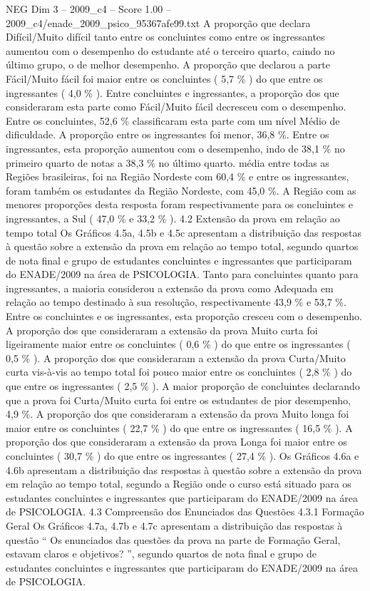 \begin{textsample}{NEG Dim 3 – 2009\_c4 – Score 1.00 – 2009\_c4/enade\_2009\_psico\_95367afe99.txt}
A proporção que declara Difícil/Muito difícil tanto entre os concluintes como entre os ingressantes aumentou com o desempenho do estudante até o terceiro quarto, caindo no último grupo, o de melhor desempenho.
A proporção que declarou a parte Fácil/Muito fácil foi maior entre os concluintes ( 5,7 \% ) do que entre os ingressantes ( 4,0 \% ).
Entre concluintes e ingressantes, a proporção dos que consideraram esta parte como Fácil/Muito fácil decresceu com o desempenho.
Entre os concluintes, 52,6 \% classificaram esta parte com um nível Médio de dificuldade.
A proporção entre os ingressantes foi menor, 36,8 \%.
Entre os ingressantes, esta proporção aumentou com o desempenho, indo de 38,1 \% no primeiro quarto de notas a 38,3 \% no último quarto. média entre todas as Regiões brasileiras, foi na Região Nordeste com 60,4 \% e entre os ingressantes, foram também os estudantes da Região Nordeste, com 45,0 \%.
A Região com as menores proporções desta resposta foram respectivamente para os concluintes e ingressantes, a Sul ( 47,0 \% e 33,2 \% ). 4.2 Extensão da prova em relação ao tempo total Os Gráficos 4.5a, 4.5b e 4.5c apresentam a distribuição das respostas à questão sobre a extensão da prova em relação ao tempo total, segundo quartos de nota final e grupo de estudantes concluintes e ingressantes que participaram do ENADE/2009 na área de PSICOLOGIA.
Tanto para concluintes quanto para ingressantes, a maioria considerou a extensão da prova como Adequada em relação ao tempo destinado à sua resolução, respectivamente 43,9 \% e 53,7 \%.
Entre os concluintes e os ingressantes, esta proporção cresceu com o desempenho.
A proporção dos que consideraram a extensão da prova Muito curta foi ligeiramente maior entre os concluintes ( 0,6 \% ) do que entre os ingressantes ( 0,5 \% ).
A proporção dos que consideraram a extensão da prova Curta/Muito curta vis-à-vis ao tempo total foi pouco maior entre os concluintes ( 2,8 \% ) do que entre os ingressantes ( 2,5 \% ).
A maior proporção de concluintes declarando que a prova foi Curta/Muito curta foi entre os estudantes de pior desempenho, 4,9 \%.
A proporção dos que consideraram a extensão da prova Muito longa foi maior entre os concluintes ( 22,7 \% ) do que entre os ingressantes ( 16,5 \% ).
A proporção dos que consideraram a extensão da prova Longa foi maior entre os concluintes ( 30,7 \% ) do que entre os ingressantes ( 27,4 \% ).
Os Gráficos 4.6a e 4.6b apresentam a distribuição das respostas à questão sobre a extensão da prova em relação ao tempo total, segundo a Região onde o curso está situado para os estudantes concluintes e ingressantes que participaram do ENADE/2009 na área de PSICOLOGIA. 4.3 Compreensão dos Enunciados das Questões 4.3.1 Formação Geral Os Gráficos 4.7a, 4.7b e 4.7c apresentam a distribuição das respostas à questão “ Os enunciados das questões da prova na parte de Formação Geral, estavam claros e objetivos? ”, segundo quartos de nota final e grupo de estudantes concluintes e ingressantes que participaram do ENADE/2009 na área de PSICOLOGIA.

\end{textsample}
